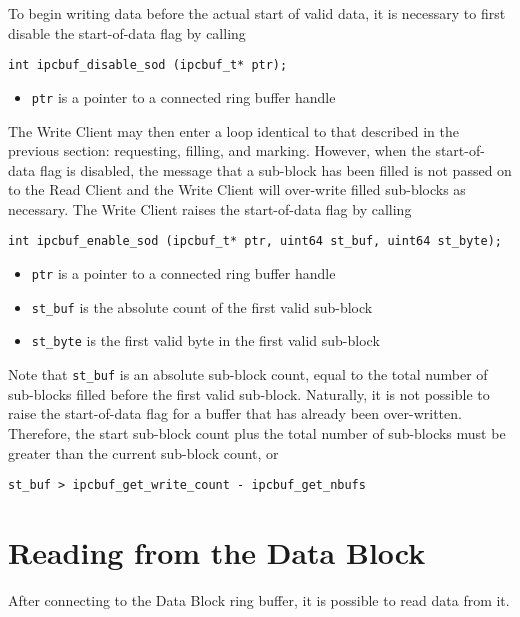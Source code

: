 To begin writing data before the actual start of valid data, it is
necessary to first disable the start-of-data flag by calling
\begin{verbatim}
int ipcbuf_disable_sod (ipcbuf_t* ptr);
\end{verbatim}
\vspace{-6mm}
\begin{itemize}
\item {\tt ptr} is a pointer to a connected ring buffer handle
\end{itemize}
The Write Client may then enter a loop identical to that described in
the previous section: requesting, filling, and marking.  However, when
the start-of-data flag is disabled, the message that a sub-block has
been filled is not passed on to the Read Client and the Write Client
will over-write filled sub-blocks as necessary.  The Write Client
raises the start-of-data flag by calling
\begin{verbatim}
int ipcbuf_enable_sod (ipcbuf_t* ptr, uint64 st_buf, uint64 st_byte);
\end{verbatim}
\vspace{-6mm}
\begin{itemize}
\item {\tt ptr} is a pointer to a connected ring buffer handle
\vspace{-2mm}
\item {\tt st\_buf} is the absolute count of the first valid sub-block
\vspace{-2mm}
\item {\tt st\_byte} is the first valid byte in the first valid sub-block
\end{itemize}

Note that {\tt st\_buf} is an absolute sub-block count, equal to the
total number of sub-blocks filled before the first valid sub-block.
Naturally, it is not possible to raise the start-of-data flag for a
buffer that has already been over-written.  Therefore, the start
sub-block count plus the total number of sub-blocks must be greater
than the current sub-block count, or
\begin{verbatim}
st_buf > ipcbuf_get_write_count - ipcbuf_get_nbufs
\end{verbatim}


\section{Reading from the Data Block}

After connecting to the Data Block ring buffer, it is possible to read
data from it.  

